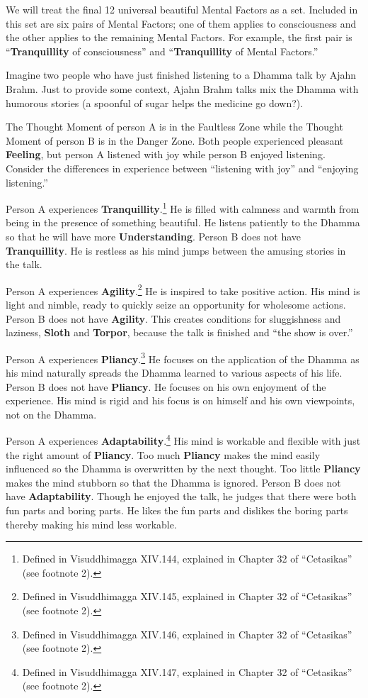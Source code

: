We will treat the final 12 universal beautiful Mental Factors as a set. Included in this set are six pairs of Mental Factors; one of them applies to consciousness and the other applies to the remaining Mental Factors. For example, the first pair is “\textbf{Tranquillity} of consciousness” and “\textbf{Tranquillity} of Mental Factors.”

Imagine two people who have just finished listening to a Dhamma talk by Ajahn Brahm. Just to provide some context, Ajahn Brahm talks mix the Dhamma with humorous stories (a spoonful of sugar helps the medicine go down?).

The Thought Moment of person A is in the Faultless Zone while the Thought Moment of person B is in the Danger Zone. Both people experienced pleasant \textbf{Feeling}, but person A listened with joy while person B enjoyed listening. Consider the differences in experience between “listening with joy” and “enjoying listening.”

Person A experiences \textbf{Tranquillity}.\footnote{Defined in Visuddhimagga XIV.144, explained in Chapter 32 of “Cetasikas” (see footnote 2).} He is filled with calmness and warmth from being in the presence of something beautiful. He listens patiently to the Dhamma so that he will have more \textbf{Understanding}. Person B does not have \textbf{Tranquillity}. He is restless as his mind jumps between the amusing stories in the talk.

Person A experiences \textbf{Agility}.\footnote{Defined in Visuddhimagga XIV.145, explained in Chapter 32 of “Cetasikas” (see footnote 2).} He is inspired to take positive action. His mind is light and nimble, ready to quickly seize an opportunity for wholesome actions. Person B does not have \textbf{Agility}. This creates conditions for sluggishness and laziness, \textbf{Sloth} and \textbf{Torpor}, because the talk is finished and “the show is over.”

Person A experiences \textbf{Pliancy}.\footnote{Defined in Visuddhimagga XIV.146, explained in Chapter 32 of “Cetasikas” (see footnote 2).} He focuses on the application of the Dhamma as his mind naturally spreads the Dhamma learned to various aspects of his life. Person B does not have \textbf{Pliancy}. He focuses on his own enjoyment of the experience. His mind is rigid and his focus is on himself and his own viewpoints, not on the Dhamma.

Person A experiences \textbf{Adaptability}.\footnote{Defined in Visuddhimagga XIV.147, explained in Chapter 32 of “Cetasikas” (see footnote 2).} His mind is workable and flexible with just the right amount of \textbf{Pliancy}. Too much \textbf{Pliancy} makes the mind easily influenced so the Dhamma is overwritten by the next thought. Too little \textbf{Pliancy} makes the mind stubborn so that the Dhamma is ignored. Person B does not have \textbf{Adaptability}. Though he enjoyed the talk, he judges that there were both fun parts and boring parts. He likes the fun parts and dislikes the boring parts thereby making his mind less workable.


